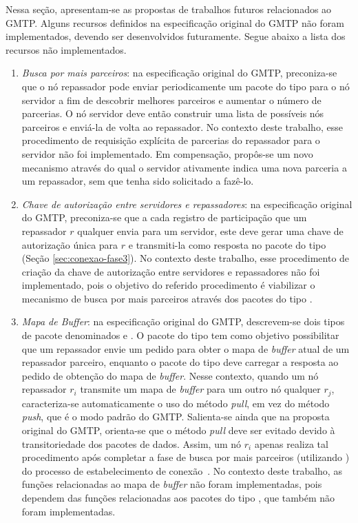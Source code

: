 Nessa seção, apresentam-se as propostas de trabalhos futuros relacionados ao GMTP. Alguns recursos definidos na especificação original do GMTP não foram implementados, devendo ser desenvolvidos futuramente. Segue abaixo a lista dos recursos não implementados.

\begin{enumerate}	
\item \textit{Busca por mais parceiros}: 
\label{item:busca}
na especificação original do GMTP, preconiza-se que o nó repassador pode enviar periodicamente um pacote do tipo  para o nó servidor a fim de descobrir melhores parceiros e aumentar o número de parcerias. O nó servidor deve então construir uma lista de possíveis nós parceiros e enviá-la de volta ao repassador. 
No contexto deste trabalho, esse procedimento de requisição explícita de parcerias do repassador para o servidor não foi implementado.
Em compensação, propôs-se um novo mecanismo através do qual o servidor ativamente indica uma nova parceria a um repassador, sem que tenha sido solicitado a fazê-lo.

\item \textit{Chave de autorização entre servidores e repassadores}:
na especificação original do GMTP, preconiza-se que a cada registro de participação que um repassador $r$ qualquer envia para um servidor, este deve gerar uma chave de autorização única para $r$ e transmiti-la como resposta no pacote do tipo  (Seção \ref{sec:conexao-fase3}).
No contexto deste trabalho, esse procedimento de criação da chave de autorização entre servidores e repassadores não foi implementado, pois o objetivo do referido procedimento é viabilizar o mecanismo de busca por mais parceiros através dos pacotes do tipo .

\item \textit{Mapa de Buffer}: 
na especificação original do GMTP, descrevem-se dois tipos de pacote denominados  e . O pacote do tipo  tem como objetivo possibilitar que um repassador envie um pedido para obter o mapa de \textit{buffer} atual de um repassador parceiro, enquanto o pacote do tipo  deve carregar a resposta ao pedido de obtenção do mapa de \textit{buffer}. 
Nesse contexto, quando um nó repassador $r_i$ transmite um mapa de \textit{buffer} para um outro nó
qualquer $r_j$, caracteriza-se automaticamente o uso do método \textit{pull}, em vez do método \textit{push}, que é o modo padrão do GMTP. Salienta-se ainda que na proposta original do GMTP, orienta-se que o método \textit{pull} deve ser evitado devido à transitoriedade dos pacotes de dados. Assim, um nó $r_i$ apenas realiza tal procedimento após completar a fase de busca por mais parceiros (utilizando ) do processo de estabelecimento de conexão~\cite{sales2014gmtp}.
No contexto deste trabalho, as funções relacionadas ao mapa de \textit{buffer} não foram implementadas, pois dependem das funções relacionadas aos pacotes do tipo , que também não foram implementadas.


\end{enumerate}
